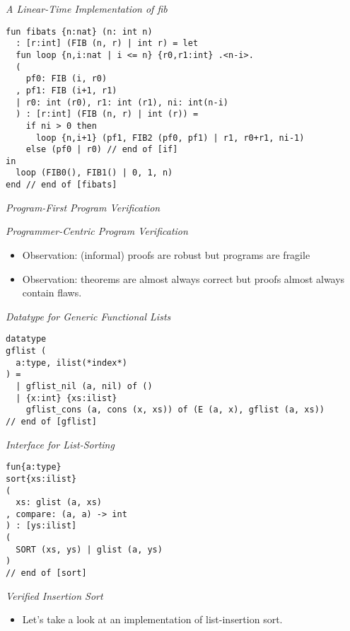 \documentclass[pdf]{prosper}
\begin{document}
\begin{slide}{\em A Linear-Time Implementation of {\it fib}}
{
\fontsize{11pt}{12pt}
\blue\begin{verbatim}
fun fibats {n:nat} (n: int n)
  : [r:int] (FIB (n, r) | int r) = let
  fun loop {n,i:nat | i <= n} {r0,r1:int} .<n-i>.
  (
    pf0: FIB (i, r0)
  , pf1: FIB (i+1, r1)
  | r0: int (r0), r1: int (r1), ni: int(n-i)
  ) : [r:int] (FIB (n, r) | int (r)) =
    if ni > 0 then
      loop {n,i+1} (pf1, FIB2 (pf0, pf1) | r1, r0+r1, ni-1)
    else (pf0 | r0) // end of [if]
in
  loop (FIB0(), FIB1() | 0, 1, n)
end // end of [fibats]
\end{verbatim}
}
\end{slide}
\begin{slide}{\em Program-First Program Verification}
\end{slide}
\begin{slide}{\em Programmer-Centric Program Verification}
\begin{itemize}
\item Observation: (informal) proofs are robust but programs are fragile
\item Observation: theorems are almost always correct but proofs almost always contain flaws.
\end{itemize}
\end{slide}
\begin{slide}{\em Datatype for Generic Functional Lists}
{\blue
\fontsize{11}{12}
\begin{verbatim}
datatype
gflist (
  a:type, ilist(*index*)
) =
  | gflist_nil (a, nil) of ()
  | {x:int} {xs:ilist}
    gflist_cons (a, cons (x, xs)) of (E (a, x), gflist (a, xs))
// end of [gflist]
\end{verbatim}
}
\end{slide}
\begin{slide}{\em Interface for List-Sorting}
{\blue
\fontsize{11}{12}
\begin{verbatim}
fun{a:type}
sort{xs:ilist}
(
  xs: glist (a, xs)
, compare: (a, a) -> int
) : [ys:ilist]
(
  SORT (xs, ys) | glist (a, ys)
)
// end of [sort]
\end{verbatim}
}
\end{slide}
\begin{slide}{\em Verified Insertion Sort}
{
\begin{itemize}
\item Let's take a look at an implementation of list-insertion sort.
\end{itemize}
}
\end{slide}
\end{document}
